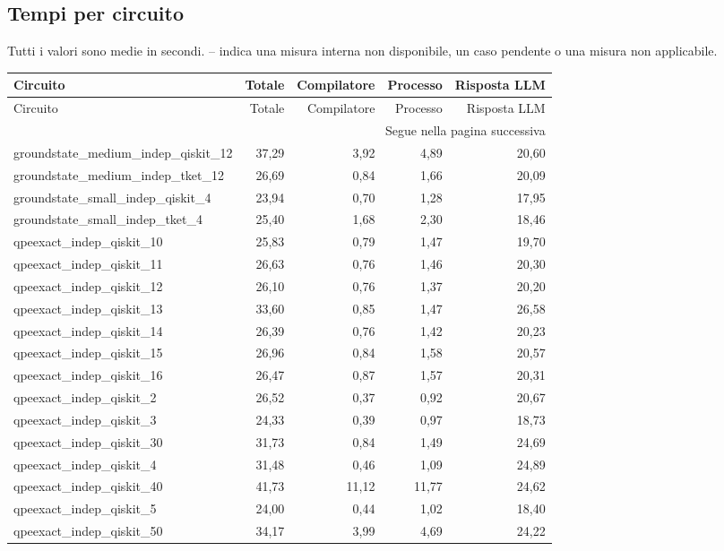 \subsection{Tempi per circuito}
Tutti i valori sono medie in secondi. -- indica una misura interna non disponibile, un caso pendente o una misura non applicabile.
\begingroup\footnotesize
\setlength{\tabcolsep}{5pt}
\begin{longtable}{lrrrr}
\toprule
Circuito & Totale & Compilatore & Processo & Risposta LLM \\
\midrule
\endfirsthead
\toprule
Circuito & Totale & Compilatore & Processo & Risposta LLM \\
\midrule\endhead
\midrule\multicolumn{5}{r}{\footnotesize Segue nella pagina successiva}\\
\endfoot
\bottomrule\endlastfoot
groundstate\_medium\_indep\_qiskit\_12 & 37,29 & 3,92 & 4,89 & 20,60 \\
groundstate\_medium\_indep\_tket\_12 & 26,69 & 0,84 & 1,66 & 20,09 \\
groundstate\_small\_indep\_qiskit\_4 & 23,94 & 0,70 & 1,28 & 17,95 \\
groundstate\_small\_indep\_tket\_4 & 25,40 & 1,68 & 2,30 & 18,46 \\
qpeexact\_indep\_qiskit\_10 & 25,83 & 0,79 & 1,47 & 19,70 \\
qpeexact\_indep\_qiskit\_11 & 26,63 & 0,76 & 1,46 & 20,30 \\
qpeexact\_indep\_qiskit\_12 & 26,10 & 0,76 & 1,37 & 20,20 \\
qpeexact\_indep\_qiskit\_13 & 33,60 & 0,85 & 1,47 & 26,58 \\
qpeexact\_indep\_qiskit\_14 & 26,39 & 0,76 & 1,42 & 20,23 \\
qpeexact\_indep\_qiskit\_15 & 26,96 & 0,84 & 1,58 & 20,57 \\
qpeexact\_indep\_qiskit\_16 & 26,47 & 0,87 & 1,57 & 20,31 \\
qpeexact\_indep\_qiskit\_2 & 26,52 & 0,37 & 0,92 & 20,67 \\
qpeexact\_indep\_qiskit\_3 & 24,33 & 0,39 & 0,97 & 18,73 \\
qpeexact\_indep\_qiskit\_30 & 31,73 & 0,84 & 1,49 & 24,69 \\
qpeexact\_indep\_qiskit\_4 & 31,48 & 0,46 & 1,09 & 24,89 \\
qpeexact\_indep\_qiskit\_40 & 41,73 & 11,12 & 11,77 & 24,62 \\
qpeexact\_indep\_qiskit\_5 & 24,00 & 0,44 & 1,02 & 18,40 \\
qpeexact\_indep\_qiskit\_50 & 34,17 & 3,99 & 4,69 & 24,22 \\

\end{longtable}
